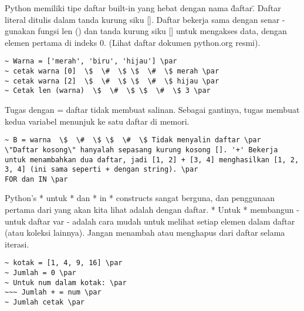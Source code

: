 Python memiliki tipe daftar built-in yang hebat dengan nama \"daftar\". Daftar literal ditulis dalam tanda kurung siku []. Daftar bekerja sama dengan senar - gunakan fungsi len () dan tanda kurung siku [] untuk mengakses data, dengan elemen pertama di indeks 0. (Lihat daftar dokumen python.org resmi). \par
\vspace{12pt}
\begin{verbatim}
~ Warna = ['merah', 'biru', 'hijau'] \par
~ cetak warna [0]  \$  \#  \$ \$  \#  \$ merah \par
~ cetak warna [2]  \$  \#  \$ \$  \#  \$ hijau \par
~ Cetak len (warna)  \$  \#  \$ \$  \#  \$ 3 \par
\end{verbatim}
\vspace{12pt}
\vspace{12pt}
  \par
Tugas dengan = daftar tidak membuat salinan. Sebagai gantinya, tugas membuat kedua variabel menunjuk ke satu daftar di memori. \par
\vspace{12pt}
\begin{verbatim}
~ B = warna  \$  \#  \$ \$  \#  \$ Tidak menyalin daftar \par
\"Daftar kosong\" hanyalah sepasang kurung kosong []. '+' Bekerja untuk menambahkan dua daftar, jadi [1, 2] + [3, 4] menghasilkan [1, 2, 3, 4] (ini sama seperti + dengan string). \par
FOR dan IN \par
\end{verbatim}
\vspace{12pt}
Python's * untuk * dan * in * constructs sangat berguna, dan penggunaan pertama dari yang akan kita lihat adalah dengan daftar. * Untuk * membangun - untuk daftar var - adalah cara mudah untuk melihat setiap elemen dalam daftar (atau koleksi lainnya). Jangan menambah atau menghapus dari daftar selama iterasi. \par
\vspace{12pt}
\begin{verbatim}
~ kotak = [1, 4, 9, 16] \par
~ Jumlah = 0 \par
~ Untuk num dalam kotak: \par
~~~ Jumlah + = num \par
~ Jumlah cetak \par
\end{verbatim}
